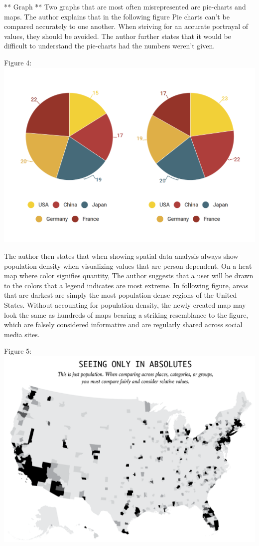 \documentclass[]{book}
\theoremstyle{definition}
\theoremstyle{definition}
\theoremstyle{definition}
\theoremstyle{remark}
\begin{document}
** Graph ** Two graphs that are most often misrepresented are pie-charts
and maps. The author explains that in the following figure Pie charts
can't be compared accurately to one another. When striving for an
accurate portrayal of values, they should be avoided. The author further
states that it would be difficult to understand the pie-charts had the
numbers weren't given.

Figure 4: \includegraphics{images/PieCharts.png}

The author then states that when showing spatial data analysis always
show population density when visualizing values that are
person-dependent. On a heat map where color signifies quantity, The
author suggests that a user will be drawn to the colors that a legend
indicates are most extreme. In following figure, areas that are darkest
are simply the most population-dense regions of the United States.
Without accounting for population density, the newly created map may
look the same as hundreds of maps bearing a striking resemblance to the
figure, which are falsely considered informative and are regularly
shared across social media sites.

Figure 5: \includegraphics{images/Maps1.png}
\end{document}

